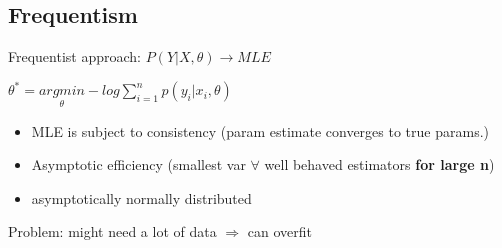 \subsection{Frequentism}

Frequentist approach: $P(Y|X,\theta) \rightarrow MLE$

$\theta^* = \underset{\theta}{argmin} -log\sum_{i=1}^np(y_i|x_i,\theta)$

\begin{itemize}
    \item MLE is subject to consistency (param estimate converges to true params.)
    \item Asymptotic efficiency (smallest var $\forall$ well behaved estimators \textbf{for large n})
    \item asymptotically normally distributed
\end{itemize}

Problem: might need a lot of data $\Rightarrow$ can overfit 